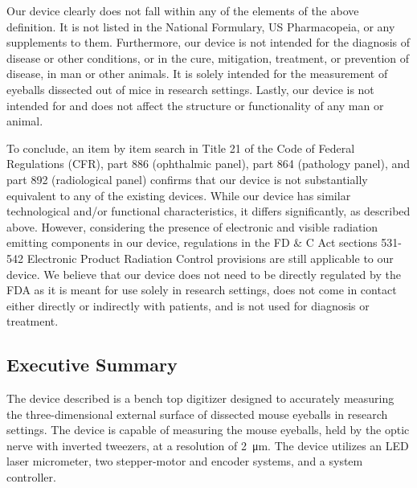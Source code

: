\documentclass{article}
\begin{document}
Our device clearly does not fall within any of the elements of the
above definition. It is not listed in the National Formulary, US
Pharmacopeia, or any supplements to them. Furthermore, our device is
not intended for the diagnosis of disease or other conditions, or in
the cure, mitigation, treatment, or prevention of disease, in man or
other animals. It is solely intended for the measurement of eyeballs
dissected out of mice in research settings. Lastly, our device is not
intended for and does not affect the structure or functionality of
any man or animal. 

To conclude, an item by item search in Title 21 of the Code of Federal
Regulations (CFR), part 886 (ophthalmic panel), part 864 (pathology
panel), and part 892 (radiological panel) confirms that our device is
not substantially equivalent to any of the existing devices. While our
device has similar technological and/or functional characteristics, it
differs significantly, as described above. However, considering the
presence of electronic and visible radiation emitting components in
our device, regulations in the FD \& C Act sections 531-542 Electronic
Product Radiation Control provisions are still applicable to our
device. We believe that our device does not need to be directly
regulated by the FDA as it is meant for use solely in research
settings, does not come in contact either directly or indirectly with
patients, and is not used for diagnosis or treatment. 

\appendix









\newpage
\setcounter{subsection}{0}
\subsection{Executive Summary}
The device described is a bench top digitizer designed to accurately
measuring the three-dimensional external surface of dissected mouse
eyeballs in research settings. The device is capable of measuring the
mouse eyeballs, held by the optic nerve with inverted tweezers, at a
resolution of \SI{2}{\micro m}. The device utilizes an LED laser
micrometer, two stepper-motor and encoder systems, and a system
controller. 
\end{document}
